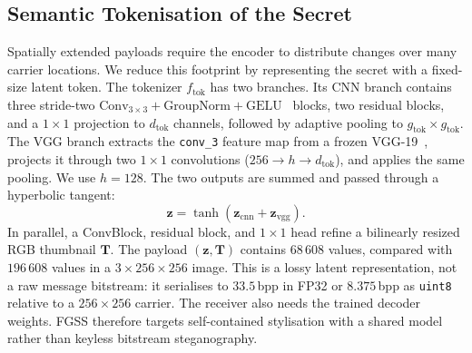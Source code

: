 \documentclass[runningheads]{llncs}
\begin{document}
\subsection{Semantic Tokenisation of the Secret}
\label{sec:tok}
Spatially extended payloads require the encoder to distribute changes over many carrier locations. We reduce this footprint by representing the secret with a fixed-size latent token. The tokenizer $f_{\text{tok}}$ has two branches. Its CNN branch contains three stride-two $\text{Conv}_{3{\times}3}{+}\text{GroupNorm}{+}\text{GELU}$~\cite{gelu} blocks, two residual blocks, and a $1\!\times\!1$ projection to $d_{\text{tok}}$ channels, followed by adaptive pooling to $g_{\text{tok}}\!\times\!g_{\text{tok}}$. The VGG branch extracts the \texttt{conv\_3} feature map from a frozen VGG-19~\cite{vgg}, projects it through two $1\!\times\!1$ convolutions ($256 \!\to\! h \!\to\! d_{\text{tok}}$), and applies the same pooling. We use $h=128$. The two outputs are summed and passed through a hyperbolic tangent:
\begin{equation}
    \mathbf{z} = \tanh\!\left(\mathbf{z}_{\text{cnn}} + \mathbf{z}_{\text{vgg}}\right).
    \label{eq:tok}
\end{equation}
In parallel, a ConvBlock, residual block, and $1\!\times\!1$ head refine a bilinearly resized RGB thumbnail $\mathbf{T}$. The payload $(\mathbf{z},\mathbf{T})$ contains $68\,608$ values, compared with $196\,608$ values in a $3\!\times\!256\!\times\!256$ image. This is a lossy latent representation, not a raw message bitstream: it serialises to $33.5$\,bpp in FP32 or $8.375$\,bpp as \texttt{uint8} relative to a $256\!\times\!256$ carrier. The receiver also needs the trained decoder weights. FGSS therefore targets self-contained stylisation with a shared model rather than keyless bitstream steganography.
\end{document}
